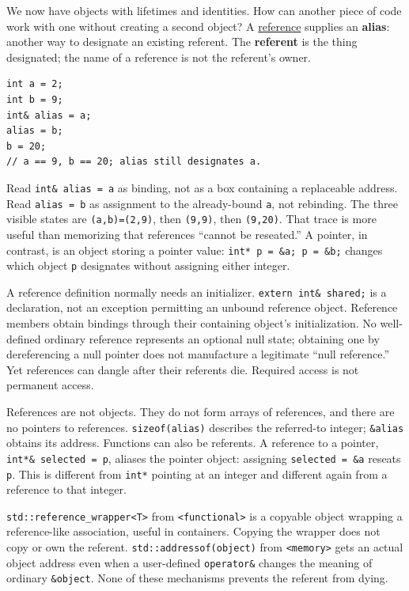 We now have objects with lifetimes and identities. How can another piece of code work with one without creating a second object? A \hyperref[appendix-d6d562ca9fbb]{reference} supplies an \textbf{alias}: another way to designate an existing referent. The \textbf{referent} is the thing designated; the name of a reference is not the referent's owner.

\begin{verbatim}
int a = 2;
int b = 9;
int& alias = a;
alias = b;
b = 20;
// a == 9, b == 20; alias still designates a.
\end{verbatim}

Read \texttt{int\&\ alias\ =\ a} as binding, not as a box containing a replaceable address. Read \texttt{alias\ =\ b} as assignment to the already-bound \texttt{a}, not rebinding. The three visible states are \texttt{(a,b)=(2,9)}, then \texttt{(9,9)}, then \texttt{(9,20)}. That trace is more useful than memorizing that references ``cannot be reseated.'' A pointer, in contrast, is an object storing a pointer value: \texttt{int*\ p\ =\ \&a;\ p\ =\ \&b;} changes which object \texttt{p} designates without assigning either integer.

A reference definition normally needs an initializer. \texttt{extern\ int\&\ shared;} is a declaration, not an exception permitting an unbound reference object. Reference members obtain bindings through their containing object's initialization. No well-defined ordinary reference represents an optional null state; obtaining one by dereferencing a null pointer does not manufacture a legitimate ``null reference.'' Yet references can dangle after their referents die. Required access is not permanent access.

References are not objects. They do not form arrays of references, and there are no pointers to references. \texttt{sizeof(alias)} describes the referred-to integer; \texttt{\&alias} obtains its address. Functions can also be referents. A reference to a pointer, \texttt{int*\&\ selected\ =\ p}, aliases the pointer object: assigning \texttt{selected\ =\ \&a} reseats \texttt{p}. This is different from \texttt{int*} pointing at an integer and different again from a reference to that integer.

\texttt{std::reference\_wrapper\textless{}T\textgreater{}} from \texttt{\textless{}functional\textgreater{}} is a copyable object wrapping a reference-like association, useful in containers. Copying the wrapper does not copy or own the referent. \texttt{std::addressof(object)} from \texttt{\textless{}memory\textgreater{}} gets an actual object address even when a user-defined \texttt{operator\&} changes the meaning of ordinary \texttt{\&object}. None of these mechanisms prevents the referent from dying.

